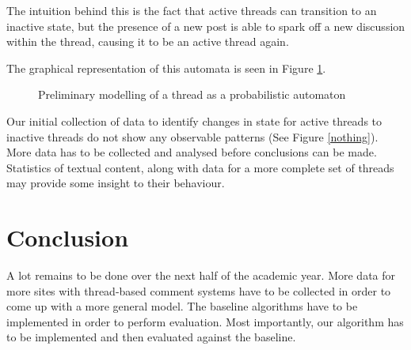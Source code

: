 \documentclass[12 pt]{article}
\begin{document}
The intuition behind this is the fact that active threads can transition to an inactive state, but the presence of a new post is able to spark off a new discussion within the thread, causing it to be an active thread again.

The graphical representation of this automata is seen in Figure \ref{spaceship}.


\begin{figure}[H]
	\begin{center}

\end{center}
	\caption{Preliminary modelling of a thread as a probabilistic automaton}\label{spaceship}
\end{figure}
Our initial collection of data to identify changes in state for active threads to inactive threads do not show any observable patterns (See Figure \ref{nothing}). More data has to be collected and analysed before conclusions can be made. Statistics of textual content, along with data for a more complete set of threads may provide some insight to their behaviour.

\section{Conclusion}
A lot remains to be done over the next half of the academic year. More data for more sites with thread-based comment systems have to be collected in order to come up with a more general model. The baseline algorithms have to be implemented in order to perform evaluation. Most importantly, our algorithm has to be implemented and then evaluated against the baseline.
\end{document}
